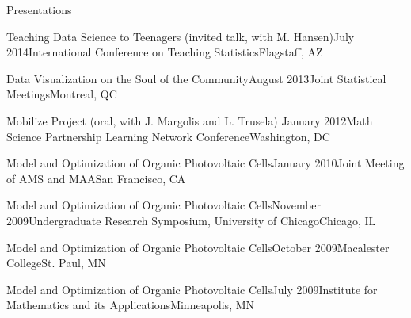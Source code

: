 \documentclass{resume} %
\begin{document}
\begin{rSection}{Presentations}
\begin{sSubsection}{Teaching Data Science to Teenagers}{ (invited talk, with M. Hansen)}{July 2014}{International Conference on Teaching Statistics}{Flagstaff, AZ}
\end{sSubsection}

\begin{sSubsection}{Data Visualization on the Soul of the Community}{}{August 2013}{Joint Statistical Meetings}{Montreal, QC}
\end{sSubsection}

\begin{sSubsection}{Mobilize Project}{ (oral, with J. Margolis and L. Trusela)} {January 2012}{Math Science Partnership Learning Network Conference}{Washington, DC}
\end{sSubsection}

\begin{sSubsection}{Model and Optimization of Organic Photovoltaic Cells}{}{January 2010}{Joint Meeting of AMS and MAA}{San Francisco, CA}
\end{sSubsection}

\begin{sSubsection}{Model and Optimization of Organic Photovoltaic Cells}{}{November 2009}{Undergraduate Research Symposium, University of Chicago}{Chicago, IL}
\end{sSubsection}

\begin{sSubsection}{Model and Optimization of Organic Photovoltaic Cells}{}{October 2009}{Macalester College}{St. Paul, MN}
\end{sSubsection}

\begin{sSubsection}{Model and Optimization of Organic Photovoltaic Cells}{}{July 2009}{Institute for Mathematics and its Applications}{Minneapolis, MN}
\end{sSubsection}
\end{rSection}

\end{document}

